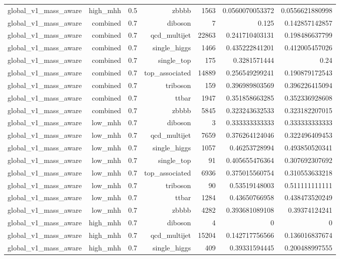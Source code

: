 \begin{table}[htbp]
{\begin{tabular}{lrrrrrr}
global\_v1\_mass\_aware & high\_mhh & 0.5 & zbbbb & 1563 & 0.0560070053372 & 0.0556621880998 \\
global\_v1\_mass\_aware & combined & 0.7 & diboson & 7 & 0.125 & 0.142857142857 \\
global\_v1\_mass\_aware & combined & 0.7 & qcd\_multijet & 22863 & 0.241710403131 & 0.198486637799 \\
global\_v1\_mass\_aware & combined & 0.7 & single\_higgs & 1466 & 0.435222841201 & 0.412005457026 \\
global\_v1\_mass\_aware & combined & 0.7 & single\_top & 175 & 0.3281571444 & 0.24 \\
global\_v1\_mass\_aware & combined & 0.7 & top\_associated & 14889 & 0.256549299241 & 0.190879172543 \\
global\_v1\_mass\_aware & combined & 0.7 & triboson & 159 & 0.396989803569 & 0.396226415094 \\
global\_v1\_mass\_aware & combined & 0.7 & ttbar & 1947 & 0.351858663285 & 0.352336928608 \\
global\_v1\_mass\_aware & combined & 0.7 & zbbbb & 5845 & 0.323243632533 & 0.323182207015 \\
global\_v1\_mass\_aware & low\_mhh & 0.7 & diboson & 3 & 0.333333333333 & 0.333333333333 \\
global\_v1\_mass\_aware & low\_mhh & 0.7 & qcd\_multijet & 7659 & 0.376264124046 & 0.322496409453 \\
global\_v1\_mass\_aware & low\_mhh & 0.7 & single\_higgs & 1057 & 0.46253728994 & 0.493850520341 \\
global\_v1\_mass\_aware & low\_mhh & 0.7 & single\_top & 91 & 0.405655476364 & 0.307692307692 \\
global\_v1\_mass\_aware & low\_mhh & 0.7 & top\_associated & 6936 & 0.375015560754 & 0.310553633218 \\
global\_v1\_mass\_aware & low\_mhh & 0.7 & triboson & 90 & 0.53519148003 & 0.511111111111 \\
global\_v1\_mass\_aware & low\_mhh & 0.7 & ttbar & 1284 & 0.43650766958 & 0.438473520249 \\
global\_v1\_mass\_aware & low\_mhh & 0.7 & zbbbb & 4282 & 0.393681089108 & 0.39374124241 \\
global\_v1\_mass\_aware & high\_mhh & 0.7 & diboson & 4 & 0 & 0 \\
global\_v1\_mass\_aware & high\_mhh & 0.7 & qcd\_multijet & 15204 & 0.142717756566 & 0.136016837674 \\
global\_v1\_mass\_aware & high\_mhh & 0.7 & single\_higgs & 409 & 0.39331594445 & 0.200488997555 \\

\end{tabular}}
\end{table}
